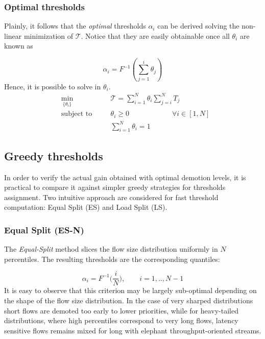 \subsubsection{Optimal thresholds}
\label{sec:pias-queueing-model}
Plainly, it follows that the \textit{optimal} thresholds $\alpha_i$ can be derived solving the non-linear minimization of $\mathcal{T}$. Notice that they are easily obtainable once all $\theta_i$ are known as 

\[
\alpha_i = F^{-1}(\sum_{j=1}^{i}\theta_j)
\]
Hence, it is possible to solve in $\theta_i$.
\begin{equation}
\label{eq::costfunction}
\begin{aligned}
&\underset{\{\theta_i\}}{\text{min}} \quad  & &\mathcal{T} = 
\sum_{i=1}^{N} \theta_i \sum_{j=i}^{N}T_j \\
&\text{subject to} \quad  & &\theta_i \ge 0 \qquad \qquad \qquad \forall i \in [1,N]  \\
& & & \sum_{i=1}^{N} \theta_i = 1 
\end{aligned}
\end{equation}

\subsection{Greedy thresholds}
\label{sec:greedy-thresh}
In order to verify the actual gain obtained with optimal demotion levels, it is practical to compare it against simpler greedy strategies for thresholds assignment. Two intuitive approach are considered for fast threshold computation: Equal Split (ES) and Load Split (LS). 

\subsubsection{Equal Split (ES-N)}
The \textit{Equal-Split} method slices the flow size distribution uniformly in $N$ percentiles. The resulting thresholds are the corresponding quantiles:

\[
\alpha_{i} = F^{-1}\Big(\dfrac{i}{N}\Big), \qquad i=1,..,N-1
\]
It is easy to observe that this criterion may be largely sub-optimal depending on the shape of the flow size distribution. In the case of very sharped distributions short flows are demoted too early to lower priorities, while for heavy-tailed distributions, where high percentiles correspond to very long flows, latency sensitive flows remains mixed for long with elephant throughput-oriented streams.

